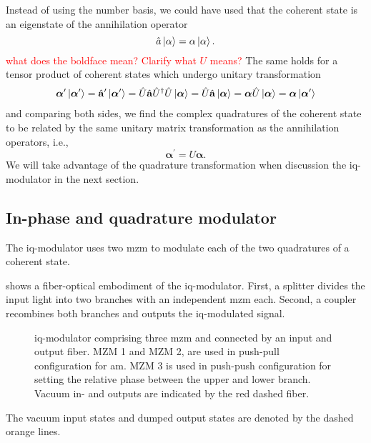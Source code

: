 Instead of using the number basis, we could have used that the coherent state is an eigenstate of the annihilation operator
\begin{equation}
	\hat{a}
	\ket{\alpha}
	=
	\alpha
	\ket{\alpha}
	.
\end{equation}
\textcolor{red}{what does the boldface mean? Clarify what $U$ means?}
The same holds for a tensor product of coherent states which undergo unitary transformation
\begin{equation}
	\begin{split}
		\boldsymbol{\alpha}^\prime
		\ket{\boldsymbol{\alpha}^\prime}
		=
		\hat{\vb{a}}^\prime
		\ket{\boldsymbol{\alpha}^\prime}
		=
		\hat{U}
		\hat{\vb{a}}
		\hat{U}^\dagger
		\hat{U}
		\ket{\boldsymbol{\alpha}}
		=
		\hat{U}
		\hat{\vb{a}}
		\ket{\boldsymbol{\alpha}}
		=
		\boldsymbol{\alpha}
		\hat{U}
		\ket{\boldsymbol{\alpha}}
		=
		\boldsymbol{\alpha}
		\ket{\boldsymbol{\alpha}^\prime}
	\end{split}
\end{equation}
and comparing both sides, we find the complex quadratures of the coherent state to be related by the same unitary matrix transformation as the annihilation operators, i.e.,
\begin{equation}
	\boldsymbol{\alpha}^\prime
	=
	U
	\boldsymbol{\alpha}
	.
\end{equation}
We will take advantage of the quadrature transformation when discussion the \gls{iq}-modulator in the next section.

\subsection{In-phase and quadrature modulator}

The \gls{iq}-modulator uses two \gls{mzm} to modulate each of the two quadratures of a coherent state.

 shows a fiber-optical embodiment of the \gls{iq}-modulator.
First, a splitter divides the input light into two branches with an independent \gls{mzm} each.
Second, a coupler recombines both branches and outputs the \gls{iq}-modulated signal.
\begin{figure}[htb]
	\centering
	
	\caption{\gls{iq}-modulator comprising three \gls{mzm} and connected by an input and output fiber. MZM 1 and MZM 2, are used in push-pull configuration for \gls{am}. MZM 3 is used in push-push configuration for setting the relative phase between the upper and lower branch. Vacuum in- and outputs are indicated by the red dashed fiber.}\label{fig:iqm}
\end{figure}
The vacuum input states and dumped output states are denoted by the dashed orange lines.

